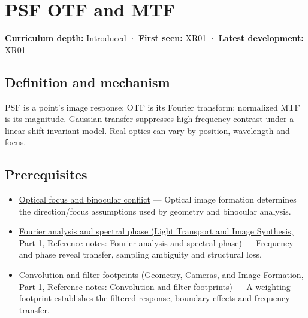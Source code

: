 \hypertarget{appendix-8b76b0efd27f}{}\label{referencestart:appendix-8b76b0efd27f}
\section{PSF OTF and MTF}\label{appendix-8b76b0efd27f-psf-otf-and-mtf}

\hypertarget{appendix-8b76b0efd27f-psf-otf-and-mtf}{}

\textbf{Curriculum depth:} Introduced · \textbf{First seen:} XR01 · \textbf{Latest development:} XR01

\begin{allmightroledefinition}

\subsection{Definition and mechanism}\label{appendix-8b76b0efd27f-definition-and-mechanism}

\hypertarget{appendix-8b76b0efd27f-definition-and-mechanism}{}

PSF is a point's image response; OTF is its Fourier transform; normalized MTF is its magnitude. Gaussian transfer suppresses high-frequency contrast under a linear shift-invariant model. Real optics can vary by position, wavelength and focus.

\end{allmightroledefinition}

\subsection{Prerequisites}\label{appendix-8b76b0efd27f-prerequisites}

\hypertarget{appendix-8b76b0efd27f-prerequisites}{}

\begin{itemize}
\tightlist
\item
  \hyperref[appendix-f90cee1be7a4]{Optical focus and binocular conflict} --- Optical image formation determines the direction/focus assumptions used by geometry and binocular analysis.
\item
  \href{../04-Light-Transport-and-Image-Synthesis-P01/main.pdf\#appendix-b60686ba06a1}{Fourier analysis and spectral phase (Light Transport and Image Synthesis, Part 1, Reference notes: Fourier analysis and spectral phase)} --- Frequency and phase reveal transfer, sampling ambiguity and structural loss.
\item
  \href{../03-Geometry-Cameras-and-Image-Formation-P01/main.pdf\#appendix-d5b3c692d9f0}{Convolution and filter footprints (Geometry, Cameras, and Image Formation, Part 1, Reference notes: Convolution and filter footprints)} --- A weighting footprint establishes the filtered response, boundary effects and frequency transfer.
\end{itemize}

